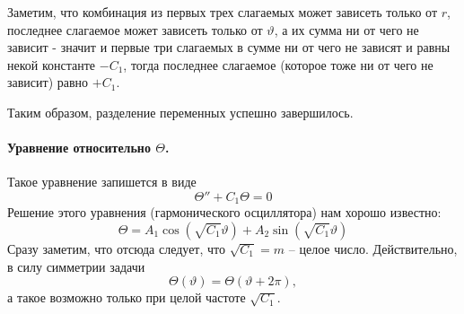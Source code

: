 Заметим, что комбинация из первых трех слагаемых может зависеть только от $r$, последнее слагаемое может зависеть только от $\vartheta$, а их сумма ни от чего не зависит - значит и первые три слагаемых в сумме ни от чего не зависят и равны некой константе $-C_1$, тогда последнее слагаемое (которое тоже ни от чего не зависит) равно $+C_1$.

Таким образом, разделение переменных успешно завершилось.
\paragraph{Уравнение относительно $\Theta$.}
Такое уравнение запишется в виде
\begin{equation}
	\Theta''+C_1\Theta=0
\end{equation}
Решение этого уравнения (гармонического осциллятора) нам хорошо известно:
\begin{equation}
	\Theta=A_1\cos(\sqrt{C_1}\vartheta)+A_2\sin(\sqrt{C_1}\vartheta)
\end{equation}
Сразу заметим, что отсюда следует, что $\sqrt{C_1}=m$ -- целое число. Действительно, в силу симметрии задачи
\begin{equation}
	\Theta(\vartheta)=\Theta(\vartheta+2\pi),
\end{equation}
а такое возможно только при целой частоте $\sqrt{C_1}$.


